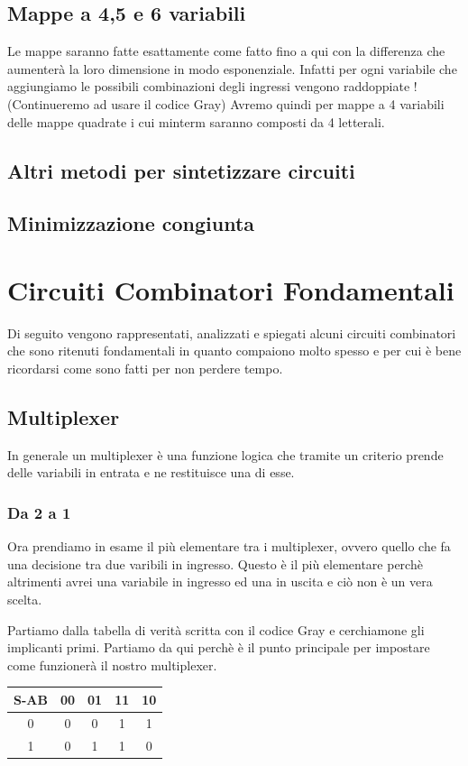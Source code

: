 \documentclass[a4paper]{book}
\begin{document}
\section{Mappe a 4,5 e 6 variabili}
Le mappe saranno fatte esattamente come fatto fino a qui con la differenza che aumenterà la loro dimensione in modo esponenziale.
Infatti per ogni variabile che aggiungiamo le possibili combinazioni degli ingressi vengono raddoppiate !
(Continueremo ad usare il codice Gray)
Avremo quindi per mappe a 4 variabili delle mappe quadrate i cui minterm saranno composti da 4 letterali.

\section{Altri metodi per sintetizzare circuiti}
\section{Minimizzazione congiunta}
\newpage	
\chapter{Circuiti Combinatori Fondamentali}

Di seguito vengono rappresentati, analizzati e spiegati alcuni circuiti combinatori che sono ritenuti fondamentali in quanto compaiono molto spesso e per cui è bene ricordarsi come sono fatti per non perdere tempo.
\section{Multiplexer}
In generale un multiplexer è una funzione logica che tramite un criterio prende delle variabili in entrata e ne restituisce una di esse.
\subsection{Da 2 a 1}
Ora prendiamo in esame il più elementare tra i multiplexer, ovvero quello che fa una decisione tra due varibili in ingresso.
Questo è il più elementare perchè altrimenti avrei una variabile in ingresso ed una in uscita e ciò non è un vera scelta.

Partiamo dalla tabella di verità scritta con il codice Gray e cerchiamone gli implicanti primi.
Partiamo da qui perchè è il punto principale per impostare come funzionerà il nostro multiplexer.\\

\begin{tabular}{|c|c|c|c|c|}
\hline
S-AB & 00 & 01 & 11 & 10 \\ \hline
0 &    0  &  0 & \cellcolor{yellow}1  & \cellcolor{yellow}1  \\ \hline  
1 &    0  &  \cellcolor{yellow}1 & \cellcolor{yellow}1  & 0  \\
\hline
\end{tabular}\break
\end{document}
